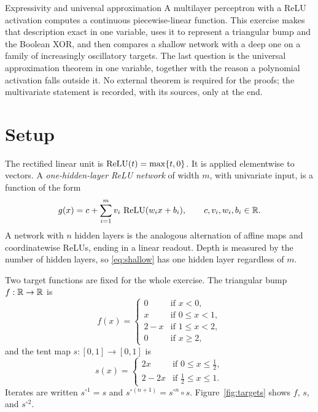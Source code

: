 



  {Expressivity and universal approximation}
  {A multilayer perceptron with a ReLU activation computes a continuous piecewise-linear function. This exercise makes that description exact in one variable, uses it to represent a triangular bump and the Boolean XOR, and then compares a shallow network with a deep one on a family of increasingly oscillatory targets. The last question is the universal approximation theorem in one variable, together with the reason a polynomial activation falls outside it. No external theorem is required for the proofs; the multivariate statement is recorded, with its sources, only at the end.}

\section{Setup}

The rectified linear unit is \(\operatorname{ReLU}(t) = \max\{t, 0\}\). It is applied elementwise to vectors. A \emph{one-hidden-layer ReLU network} of width \(m\), with univariate input, is a function of the form
\begin{equation}
  g(x)
  =
  c + \sum_{i=1}^{m} v_i\,\operatorname{ReLU}(w_i x + b_i),
  \qquad
  c,v_i,w_i,b_i\in\mathbb{R}.
  \label{eq:shallow}
\end{equation}
A network with \(n\) hidden layers is the analogous alternation of affine maps and coordinatewise ReLUs, ending in a linear readout. Depth is measured by the number of hidden layers, so \eqref{eq:shallow} has one hidden layer regardless of \(m\).

Two target functions are fixed for the whole exercise. The triangular bump \(f:\mathbb{R}\to\mathbb{R}\) is
\begin{equation}
  f(x) =
  \begin{cases}
    0 & \text{if } x < 0,\\
    x & \text{if } 0 \le x < 1,\\
    2-x & \text{if } 1 \le x < 2,\\
    0 & \text{if } x \ge 2,
  \end{cases}
  \label{eq:bump}
\end{equation}
and the tent map \(s:[0,1]\to[0,1]\) is
\begin{equation}
  s(x) =
  \begin{cases}
    2x & \text{if } 0 \le x \le \tfrac12,\\
    2-2x & \text{if } \tfrac12 \le x \le 1.
  \end{cases}
  \label{eq:tent}
\end{equation}
Iterates are written \(s^{\circ 1} = s\) and \(s^{\circ(n+1)} = s^{\circ n}\circ s\). Figure~\ref{fig:targets} shows \(f\), \(s\), and \(s^{\circ 2}\).

